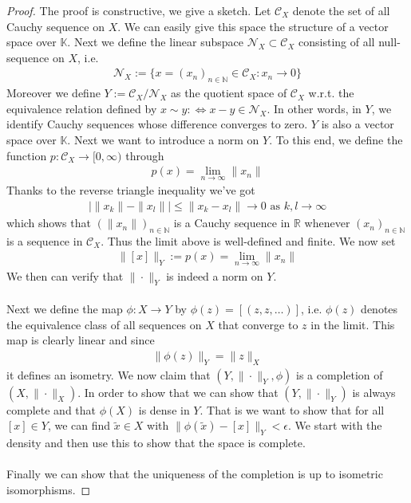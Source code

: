 \documentclass[11pt,a4paper]{article}
\theoremstyle{definition}
\begin{document}
\begin{proof}
The proof is constructive, we give a sketch.  Let $\mathcal{C}_X$ denote the set of all Cauchy sequence on $X$. We can easily give this space the structure of a vector space over $\mathbb{K}$. Next we define the linear subspace $\mathcal{N}_X \subset \mathcal{C}_X$ consisting of all null-sequence on $X$, i.e.
\begin{align*}
\mathcal{N}_X := \lbrace x = (x_n)_{n \in \mathbb{N}} \in \mathcal{C}_X : x_n \to 0 \rbrace
\end{align*}
Moreover we define $Y:= \mathcal{C}_X/ \mathcal{N}_X$ as the quotient space of $\mathcal{C}_X$ w.r.t. the equivalence relation defined by $x \sim y : \iff x-y \in \mathcal{N}_X$. In other words, in $Y$, we identify Cauchy sequences whose difference converges to zero. $Y$ is also a vector space over $\mathbb{K}$. 
\newpage
Next we want to introduce a norm on $Y$. To this end, we define the function $p: \mathcal{C}_X \to [0, \infty)$ through 
\begin{align*}
p(x)= \lim_{n \to \infty} \| x_n \|
\end{align*}
Thanks to the reverse triangle inequality we've got
\begin{align*}
| \|x_k\| - \|x_l\| | \leq \|x_k - x_l\| \to 0 \text{ as } k,l \to \infty
\end{align*}
which shows that $(\|x_n\|)_{n \in \mathbb{N}}$ is a Cauchy sequence in $\mathbb{R}$ whenever $(x_n)_{n \in \mathbb{N}}$ is a sequence in $\mathcal{C}_X$. Thus the limit above is well-defined and finite. We now set 
\begin{align*}
\|[x]\|_Y := p(x)= \lim_{n \to \infty} \|x_n\|
\end{align*}
We then can verify that $\| \cdot \|_Y$ is indeed a norm on $Y$. \\
\\
Next we define the map $\phi : X \to Y$ by $\phi (z)=[(z,z, \dots )]$, i.e. $\phi(z)$ denotes the equivalence class of all sequences on $X$ that converge to $z$ in the limit. This map is clearly linear and since 
\begin{align*}
\| \phi(z)\|_Y= \|z\|_X
\end{align*}
it defines an isometry. We now claim that $(Y, \| \cdot \|_Y, \phi)$ is a completion of $(X, \| \cdot \|_X)$. In order to show that we can show that $( Y, \| \cdot \|_Y)$ is always complete and that $\phi(X)$ is dense in $Y$. That is we want to show that for all $[x] \in Y$, we can find $\tilde{x} \in X$ with $\| \phi(\tilde{x}) - [x]\|_Y < \epsilon$. We start with the density and then use this to show that the space is complete. 
\\\\
Finally we can show that the uniqueness of the completion is up to isometric isomorphisms. 
\end{proof}
\end{document}
